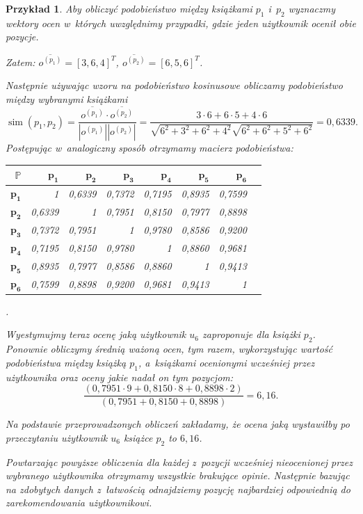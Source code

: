\documentclass[12pt,a4paper]{report}
\newtheorem{przyklad}{Przykład}[chapter]{\normalfont}
\newcommand{\similarity}[2]{\operatorname{sim}\left({#1}, {#2} \right)}
\begin{document}
\begin{przyklad}
Aby obliczyć podobieństwo między książkami $p_1$ i~$p_2$ wyznaczmy wektory ocen w~których uwzględnimy przypadki, gdzie jeden użytkownik ocenił obie pozycje.

Zatem: $\overline{o^{(p_1)}} = [3, 6, 4]^T$, $\overline{o^{(p_2)}} =[6, 5, 6]^T$.

Następnie używając wzoru na podobieństwo kosinusowe obliczamy podobieństwo między wybranymi książkami
$$
\similarity{p_1}{p_2} = \frac{\overline{o^{(p_1)}} \cdot \overline{o^{(p_2)}}}{|o^{(p_1)}||o^{(p_2)}|} = \frac{3 \cdot 6 + 6 \cdot 5 + 4 \cdot 6}{\sqrt{6^2 + 3^2 + 6^2 + 4^2} \sqrt{6^2 + 6^2 + 5^2 + 6^2}} = 0,6339.
$$
Postępując w~analogiczny sposób otrzymamy macierz podobieństwa:
\begin{center}
\begin{tabular}{|r|r|r|r|r|r|r|r|} \hline
$\mathbb{P}$ & $\mathbf{p_1}$ & $\mathbf{p_2}$ & $\mathbf{p_3}$ & $\mathbf{p_4}$ & $\mathbf{p_5}$ & $\mathbf{p_6}$ \\
\hline
$\mathbf{p_1}$ & 1 & 0,6339 & 0,7372 & 0,7195 & 0,8935 & 0,7599 \\
\hline
$\mathbf{p_2}$ & 0,6339 & 1 & 0,7951 & 0,8150 & 0,7977 & 0,8898 \\
\hline
$\mathbf{p_3}$ & 0,7372 & 0,7951 & 1 & 0,9780 & 0,8586 & 0,9200 \\
\hline
$\mathbf{p_4}$ & 0,7195 & 0,8150 & 0,9780 & 1 & 0,8860 & 0,9681 \\
\hline 
$\mathbf{p_5}$ & 0,8935 & 0,7977 & 0,8586 & 0,8860 & 1 & 0,9413 \\
\hline 
$\mathbf{p_6}$ & 0,7599 & 0,8898 & 0,9200 & 0,9681 & 0,9413 & 1 \\
\hline 
\end{tabular}.
\end{center}
Wyestymujmy teraz ocenę jaką użytkownik $u_6$ zaproponuje dla książki $p_2$. Ponownie obliczymy średnią ważoną ocen, tym razem, wykorzystując wartość podobieństwa między książką $p_1$, a~książkami ocenionymi wcześniej przez użytkownika oraz oceny jakie nadał on tym pozycjom:
$$
\frac{(0,7951 \cdot 9 + 0,8150 \cdot 8 + 0,8898 \cdot 2)}{(0,7951 + 0,8150 + 0,8898)} = 6,16.
$$

Na podstawie przeprowadzonych obliczeń zakładamy, że ocena jaką wystawiłby po przeczytaniu użytkownik $u_6$ książce $p_2$ to $6,16$.

Powtarzając powyższe obliczenia dla każdej z~pozycji wcześniej nieocenionej przez wybranego użytkownika otrzymamy wszystkie brakujące opinie. Następnie bazując na zdobytych danych z~łatwością odnajdziemy pozycję najbardziej odpowiednią do zarekomendowania użytkownikowi.
\end{przyklad}
\end{document}
